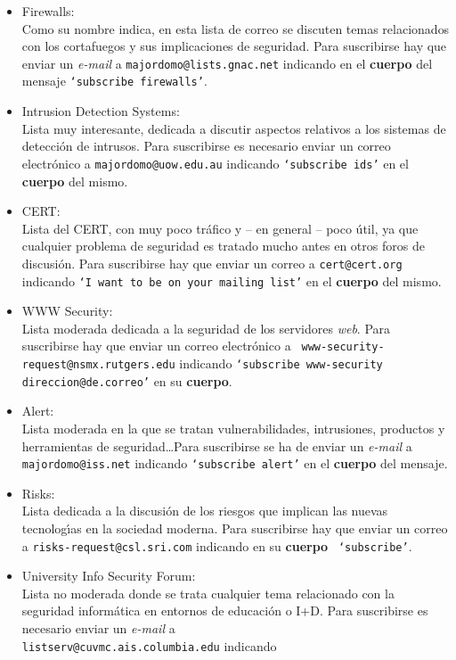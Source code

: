 \begin{itemize}
{\tt `sub cudigest'}.
\item Firewalls:\\
Como su nombre indica, en esta lista de correo se discuten temas relacionados
con los cortafuegos y sus implicaciones de seguridad. Para suscribirse hay que
enviar un {\it e-mail} a {\tt majordomo@lists.gnac.net} indicando en el {\bf
cuerpo} del mensaje {\tt `subscribe firewalls'}.
\item Intrusion Detection Systems:\\
Lista muy interesante, dedicada a discutir aspectos relativos a los sistemas de 
detecci\'on de intrusos. Para suscribirse es necesario enviar un correo
electr\'onico a {\tt majordomo@uow.edu.au} indicando {\tt `subscribe ids'} en 
el {\bf cuerpo} del mismo.
\item CERT:\\
Lista del CERT, con muy poco tr\'afico y -- en general -- poco \'util, ya que
cualquier problema de seguridad es tratado mucho antes en otros foros de 
discusi\'on. Para suscribirse hay que enviar un correo a {\tt cert@cert.org}
indicando {\tt `I want to be on your mailing list'} en el {\bf cuerpo} del
mismo.
\item WWW Security:\\
Lista moderada dedicada a la seguridad de los servidores {\it web}. Para 
suscribirse hay que enviar un correo electr\'onico a {\tt 
www-security-request@nsmx.rutgers.edu} indicando {\tt `subscribe www-security
direccion@de.correo'} en su {\bf cuerpo}.
\item Alert:\\
Lista moderada en la que se tratan vulnerabilidades, intrusiones, productos
y herramientas de seguridad\ldots Para suscribirse se ha de enviar un {\it
e-mail} a {\tt majordomo@iss.net} indicando {\tt `subscribe alert'} en el {\bf
cuerpo} del mensaje.
\item Risks:\\
Lista dedicada a la discusi\'on de los riesgos que implican las nuevas 
tecnolog\'{\i}as en la sociedad moderna. Para suscribirse hay que enviar un
correo a {\tt risks-request@csl.sri.com} indicando en su {\bf cuerpo} {\tt 
`subscribe'}.
\item University Info Security Forum:\\
Lista no moderada donde se trata cualquier tema relacionado con la seguridad
inform\'atica en entornos de educaci\'on o I+D. Para suscribirse es necesario
enviar un {\it e-mail} a\\ {\tt listserv@cuvmc.ais.columbia.edu} indicando {\tt
}
\end{itemize}
